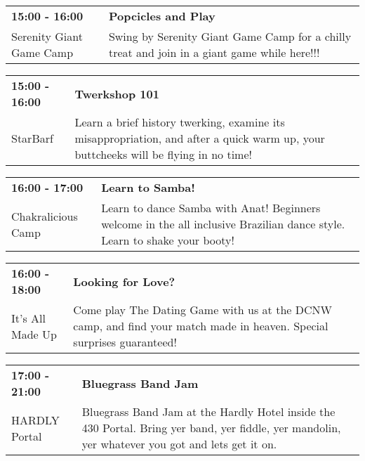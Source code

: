 \begin{tabular}{ p{1in} p{2.2in} }
    \textbf{15:00 - 16:00} & \textbf{Popcicles and Play} \\
    Serenity Giant Game Camp \newline  & Swing by Serenity Giant Game Camp for a chilly treat and join in a giant game while here!!! \\
    \hline 
\end{tabular}
    
\begin{tabular}{ p{1in} p{2.2in} }
    \textbf{15:00 - 16:00} & \textbf{Twerkshop 101} \\
    StarBarf \newline  & Learn a brief history twerking, examine its misappropriation, and after a quick warm up, your buttcheeks will be flying in no time! \\
    \hline 
\end{tabular}
    
\begin{tabular}{ p{1in} p{2.2in} }
    \textbf{16:00 - 17:00} & \textbf{Learn to Samba!} \\
    Chakralicious Camp \newline  & Learn to dance Samba with Anat! Beginners welcome in the all inclusive Brazilian dance style. Learn to shake your booty! \\
    \hline 
\end{tabular}
    
\begin{tabular}{ p{1in} p{2.2in} }
    \textbf{16:00 - 18:00} & \textbf{Looking for Love?} \\
    It's All Made Up \newline  & Come play The Dating Game with us at the DCNW camp, and find your match made in heaven. Special surprises guaranteed! \\
    \hline 
\end{tabular}
    
\begin{tabular}{ p{1in} p{2.2in} }
    \textbf{17:00 - 21:00} & \textbf{Bluegrass Band Jam} \\
    HARDLY \newline 430 Portal & Bluegrass Band Jam at the Hardly Hotel inside the 430 Portal.  Bring yer band, yer fiddle, yer mandolin, yer whatever you got and lets get it on. \\
    \hline 
\end{tabular}
    
